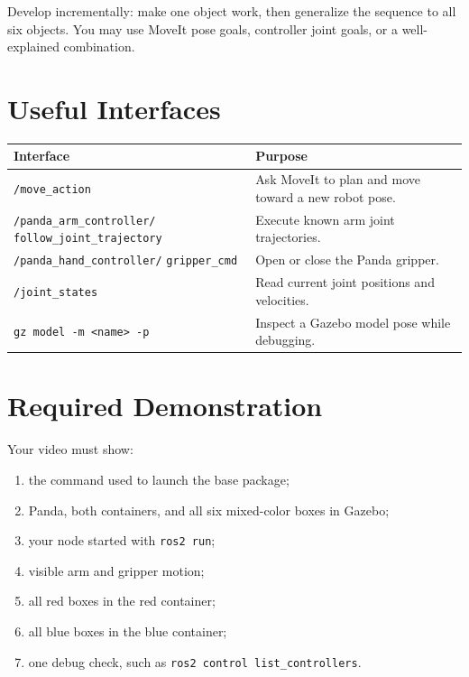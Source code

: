 \documentclass[11pt]{article}
\begin{document}
Develop incrementally: make one object work, then generalize the sequence to
all six objects. You may use MoveIt pose goals, controller joint goals, or a
well-explained combination.

\section*{Useful Interfaces}

\begin{tabularx}{\textwidth}{@{}p{}Y@{}}
\toprule
\textbf{Interface} & \textbf{Purpose} \\
\midrule
\texttt{/move\_action} & Ask MoveIt to plan and move toward a new robot pose. \\
\texttt{/panda\_arm\_controller/}\newline
\texttt{follow\_joint\_trajectory} & Execute known arm joint trajectories. \\
\texttt{/panda\_hand\_controller/}\newline
\texttt{gripper\_cmd} & Open or close the Panda gripper. \\
\texttt{/joint\_states} & Read current joint positions and velocities. \\
\texttt{gz model -m <name> -p} & Inspect a Gazebo model pose while debugging. \\
\bottomrule
\end{tabularx}

\section*{Required Demonstration}

Your video must show:

\begin{enumerate}[leftmargin=2em]
  \item the command used to launch the base package;
  \item Panda, both containers, and all six mixed-color boxes in Gazebo;
  \item your node started with \texttt{ros2 run};
  \item visible arm and gripper motion;
  \item all red boxes in the red container;
  \item all blue boxes in the blue container;
  \item one debug check, such as \texttt{ros2 control list\_controllers}.
\end{enumerate}
\end{document}
